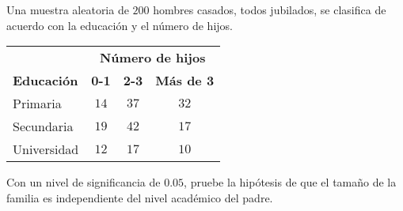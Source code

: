 \begin{enunciado}
 Una muestra aleatoria de $200$ hombres casados, todos jubilados, se clasifica
 de acuerdo con la educaci\'on y el n\'umero de hijos.
 \begin{center}
  \begin{tabular}{lccc}
   & \multicolumn{3}{c}{\textbf{N\'umero de hijos}} \\
   \cline{2-4}
   \textbf{Educaci\'on} & \textbf{0-1} & \textbf{2-3} & \textbf{M\'as de 3} \\
   \hline
   Primaria & $14$ & $37$ & $32$ \\
   Secundaria & $19$ & $42$ & $17$ \\
   Universidad & $12$ & $17$ & $10$
  \end{tabular}
 \end{center}
 Con un nivel de significancia de $0.05$, pruebe la hip\'otesis
 de que el tama\~no de la familia es independiente del nivel acad\'emico
 del padre.
\end{enunciado}

